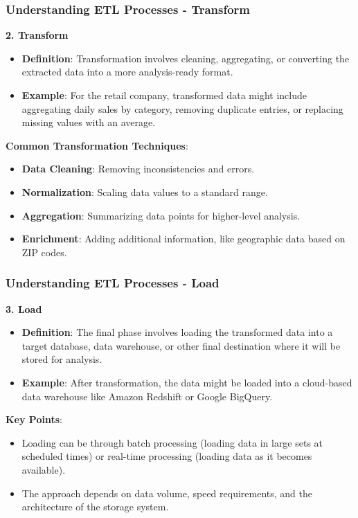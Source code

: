 \documentclass[aspectratio=169]{beamer}
\begin{document}
\begin{frame}[fragile]
    \frametitle{Understanding ETL Processes - Transform}

    \textbf{2. Transform}

    \begin{itemize}
        \item \textbf{Definition}: Transformation involves cleaning, aggregating, or converting the extracted data into a more analysis-ready format.
        \item \textbf{Example}: For the retail company, transformed data might include aggregating daily sales by category, removing duplicate entries, or replacing missing values with an average.
    \end{itemize}

    \textbf{Common Transformation Techniques}:
    \begin{itemize}
        \item \textbf{Data Cleaning}: Removing inconsistencies and errors.
        \item \textbf{Normalization}: Scaling data values to a standard range.
        \item \textbf{Aggregation}: Summarizing data points for higher-level analysis.
        \item \textbf{Enrichment}: Adding additional information, like geographic data based on ZIP codes.
    \end{itemize}
\end{frame}

\begin{frame}[fragile]
    \frametitle{Understanding ETL Processes - Load}

    \textbf{3. Load}

    \begin{itemize}
        \item \textbf{Definition}: The final phase involves loading the transformed data into a target database, data warehouse, or other final destination where it will be stored for analysis.
        \item \textbf{Example}: After transformation, the data might be loaded into a cloud-based data warehouse like Amazon Redshift or Google BigQuery.
    \end{itemize}

    \textbf{Key Points}:
    \begin{itemize}
        \item Loading can be through batch processing (loading data in large sets at scheduled times) or real-time processing (loading data as it becomes available).
        \item The approach depends on data volume, speed requirements, and the architecture of the storage system.
    \end{itemize}
\end{frame}
\end{document}

